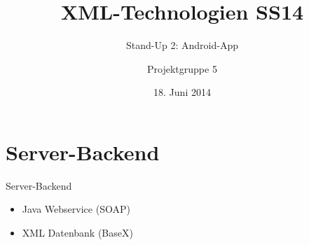 \documentclass[ucs,9pt]{beamer}
\title{XML-Technologien SS14}
\subtitle{Stand-Up 2: Android-App}
\author{Projektgruppe 5}
\institute{Freie Universität Berlin}
\date{18. Juni 2014}
\begin{document}
\begin{frame}[plain]
  \titlepage
\end{frame}

\section{Server-Backend}

\begin{frame}{Server-Backend}
	\begin{itemize}
		\item Java Webservice (SOAP)
		\item XML Datenbank (BaseX)
	\end{itemize}
\end{frame}
\end{document}
